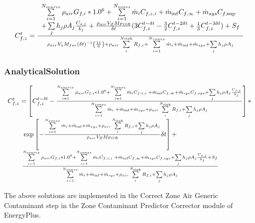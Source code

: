 \begin{equation}
\begin{array}{l}C_{f,z}^t = \frac{\begin{array}{l}\sum\limits_{i = 1}^{{N_{source}}} {{\rho_{air}}{G_{f,i}}*{{1.0}^6}}  + \sum\limits_{i = 1}^{{N_{zones}}} {{{\dot m}_i}{C_{f,z,i}}}  + {{\dot m}_{\inf }}{C_{f,\infty }} + {{\dot m}_{sys}}{C_{f,\sup }}\\ + \sum\limits_j {{h_j}\rho {A_j}\frac{{{C_{s,j}}}}{{{k_j}}} + \frac{{{\rho_{air}}{V_Z}{M_{FOR}}}}{{\delta t}}(3C_{f,z}^{t - \delta t} - \frac{3}{2}C_{f,z}^{t - 2\delta t} + \frac{1}{3}C_{f,z}^{t - 3\delta t}) + {S_f}} \end{array}}{{{\rho_{air}}{V_z}{M_{for}}{{\left( {\delta t} \right)}^{ - 1}}\left( {\frac{{11}}{6}} \right) + {\rho_{air}}\sum\limits_i^{N{\rm{sink}}} {{R_{f,i}}}  + \sum\limits_{i = 1}^{{N_{zones}}} {{{\dot m}_i}}  + {{\dot m}_{\inf }} + {{\dot m}_{sys}} + \sum\limits_j {{h_j}\rho {A_j}} }}\\\end{array}
\end{equation}

\subsubsection{AnalyticalSolution}\label{analyticalsolution-1-000}

\begin{equation}
\begin{array}{l}C_{f,z}^t = \left[ {C_{f,z}^{t - \delta t} - \frac{{\sum\limits_{i = 1}^{{N_{source}}} {{\rho_{air}}{G_{f,i}}*{{1.0}^6}}  + \sum\limits_{i = 1}^{{N_{zones}}} {{{\dot m}_i}} {C_{f,z,i}}\; + {{\dot m}_{\inf }}{C_{f,\infty }} + {{\dot m}_{sys}}{C_{f,sys}} + \sum\limits_j {{h_j}\rho {A_j}} \frac{{{C_{s,j}}}}{{{k_j}}}}}{{\sum\limits_{i = 1}^{{N_{zones}}} {{{\dot m}_i}} \; + {{\dot m}_{\inf }} + {{\dot m}_{sys}} + {\rho_{air}}\sum\limits_i^{{N_{{\rm{sink}}}}} {{R_{f,i}} + \sum\limits_j {{h_j}\rho {A_j}} } }}} \right]*\\\;\;\;\;\;\;\;\;\;\exp \left[ { - \frac{{\sum\limits_{i = 1}^{{N_{zones}}} {{{\dot m}_i}}  + {{\dot m}_{\inf }} + {{\dot m}_{sys}} + {\rho_{air}}\sum\limits_i^{{N_{{\rm{sink}}}}} {{R_{f,i}} + \sum\limits_j {{h_j}\rho {A_j}} } }}{{{\rho_{air}}{V_Z}{M_{FOR}}}}\delta t} \right] + \\\;\;\;\;\;\;\;\;\frac{{\sum\limits_{i = 1}^{{N_{source}}} {{\rho_{air}}{G_{f,i}}*{{1.0}^6}}  + \sum\limits_{i = 1}^{{N_{zones}}} {{{\dot m}_i}} {C_{f,z,i}}\; + {{\dot m}_{\inf }}{C_{f,\infty }} + {{\dot m}_{sys}}{C_{f,sys}} + \sum\limits_j {{h_j}\rho {A_j}} \frac{{{C_{s,j}}}}{{{k_j}}} + {S_f}}}{{\sum\limits_{i = 1}^{{N_{zones}}} {{{\dot m}_i}}  + {{\dot m}_{\inf }} + {{\dot m}_{sys}} + {\rho_{air}}\sum\limits_i^{{N_{{\rm{sink}}}}} {{R_{f,i}} + \sum\limits_j {{h_j}\rho {A_j}} } }}\end{array}
\end{equation}

The above solutions are implemented in the Correct Zone Air Generic Contaminant step in the Zone Contaminant Predictor Corrector module of EnergyPlus.
